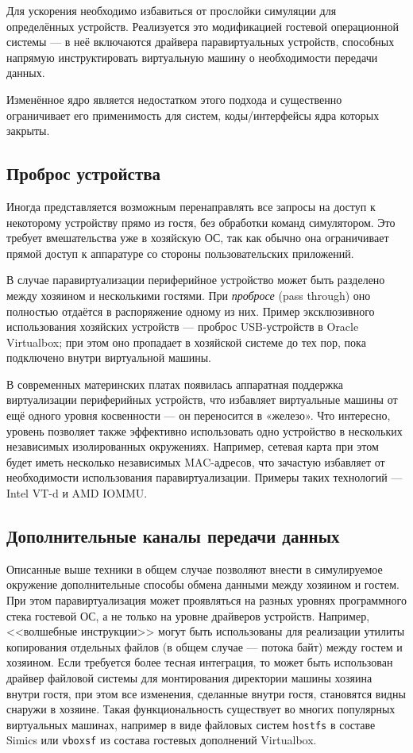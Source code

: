 Для ускорения необходимо избавиться от прослойки симуляции для определённых устройств. Реализуется это модификацией гостевой операционной системы — в неё включаются драйвера паравиртуальных устройств, способных напрямую инструктировать виртуальную машину о необходимости передачи данных.

Изменённое ядро является недостатком этого подхода и существенно ограничивает его применимость для систем, коды/интерфейсы ядра которых закрыты.

\subsection{Проброс устройства}

Иногда представляется возможным перенаправлять все запросы на доступ к некоторому устройству прямо из гостя, без обработки команд симулятором. Это требует вмешательства уже в хозяйскую ОС, так как обычно она ограничивает  прямой доступ к аппаратуре со стороны пользовательских приложений.

В случае паравиртуализации периферийное устройство может быть разделено между хозяином и несколькими гостями. При \textit{пробросе} (\abbr pass through) оно полностью отдаётся в распоряжение одному из них. Пример эксклюзивного использования хозяйских устройств — проброс USB-устройств в Oracle Virtualbox; при этом оно пропадает в хозяйской системе до тех пор, пока подключено внутри виртуальной машины.

В современных материнских платах появилась аппаратная поддержка виртуализации периферийных устройств, что избавляет виртуальные машины от ещё одного уровня косвенности — он переносится в «железо». Что интересно, уровень позволяет также эффективно использовать одно устройство в нескольких независимых изолированных окружениях. Например, сетевая карта при этом будет иметь несколько независимых MAC-адресов, что зачастую избавляет от необходимости использования паравиртуализации. Примеры таких технологий — Intel VT-d и AMD IOMMU.

\subsection{Дополнительные каналы передачи данных}

Описанные выше техники в общем случае позволяют внести в симулируемое окружение дополнительные способы обмена данными между хозяином и гостем. При этом паравиртуализация может проявляться на разных уровнях программного стека гостевой ОС, а не только на уровне драйверов устройств. Например, <<волшебные инструкции>> могут быть использованы для реализации утилиты копирования  отдельных файлов (в общем случае — потока байт) между гостем и хозяином. Если требуется более тесная интеграция, то может быть использован драйвер файловой системы для монтирования директории машины хозяина внутри гостя, при этом все изменения, сделанные внутри гостя, становятся видны снаружи в хозяине. Такая функциональность существует во многих популярных виртуальных машинах, например в виде файловых систем \texttt{hostfs} в составе Simics или \texttt{vboxsf} из состава гостевых дополнений Virtualbox.


